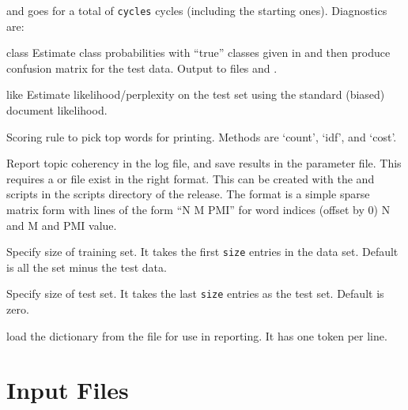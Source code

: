\documentclass[a4paper,english]{article}
\begin{document}
\begin{Description}
and goes for a total of \texttt{cycles} cycles
(including the starting ones).
Diagnostics are:
\begin{Description}[class]\setlength{\itemsep}{0cm}
\item[class] 
Estimate class probabilities with ``true'' classes
given in  and then
produce confusion matrix for the test data.
Output to files
 and .
\item[like] 
Estimate likelihood/perplexity on the test set
using the standard (biased) document likelihood.
\end{Description}
\item[\OptArg{-o}{score}]  Scoring rule to pick top words for printing.
Methods are `count', `idf', and `cost'.
\item[\OptArg{-p}] Report topic coherency in the log file, and 
save results in the parameter file.  This requires 
a  or  file exist
in the right format.  This can be created with the 
 and
 scripts in the scripts directory of the release.
The format is a simple sparse matrix form with lines
of the form ``N M PMI'' for word indices
(offset by 0) N and M and PMI value.
\item[\OptArg{-t}{size}]  Specify size of training set.  It takes the
first \texttt{size} entries in the data set. Default is all the
set minus the test data.
\item[\OptArg{-T}{size}]  Specify size of test set.  It takes the last
\texttt{size} entries as the test set.
Default is zero.
\item[\Opt{-V}]  load the dictionary from the
 file for use in reporting.  It has one token per line.
\end{Description}

\section{Input Files}
\end{document}
